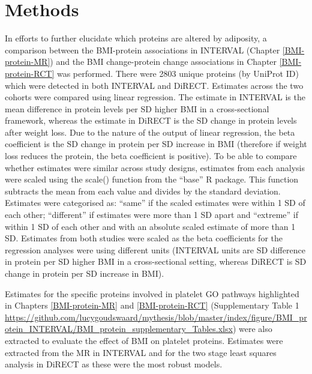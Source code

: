 \documentclass[11pt,twoside]{bristolthesis}
\begin{document}
\hypertarget{methods-4}{%
\section{Methods}\label{methods-4}}

In efforts to further elucidate which proteins are altered by adiposity, a comparison between the BMI-protein associations in INTERVAL (Chapter \ref{BMI-protein-MR}) and the BMI change-protein change associations in Chapter \ref{BMI-protein-RCT} was performed. There were 2803 unique proteins (by UniProt ID) which were detected in both INTERVAL and DiRECT. Estimates across the two cohorts were compared using linear regression. The estimate in INTERVAL is the mean difference in protein levels per SD higher BMI in a cross-sectional framework, whereas the estimate in DiRECT is the SD change in protein levels after weight loss. Due to the nature of the output of linear regression, the beta coefficient is the SD change in protein per SD increase in BMI (therefore if weight loss reduces the protein, the beta coefficient is positive). To be able to compare whether estimates were similar across study designs, estimates from each analysis were scaled using the scale() function from the ``base'' R package. This function subtracts the mean from each value and divides by the standard deviation. Estimates were categorised as: ``same'' if the scaled estimates were within 1 SD of each other; ``different'' if estimates were more than 1 SD apart and ``extreme'' if within 1 SD of each other and with an absolute scaled estimate of more than 1 SD. Estimates from both studies were scaled as the beta coefficients for the regression analyses were using different units (INTERVAL units are SD difference in protein per SD higher BMI in a cross-sectional setting, whereas DiRECT is SD change in protein per SD increase in BMI).

Estimates for the specific proteins involved in platelet GO pathways highlighted in Chapters \ref{BMI-protein-MR} and \ref{BMI-protein-RCT} (Supplementary Table 1 \url{https://github.com/lucygoudswaard/mythesis/blob/master/index/figure/BMI_protein_INTERVAL/BMI_protein_supplementary_Tables.xlsx}) were also extracted to evaluate the effect of BMI on platelet proteins. Estimates were extracted from the MR in INTERVAL and for the two stage least squares analysis in DiRECT as these were the most robust models.
\end{document}
